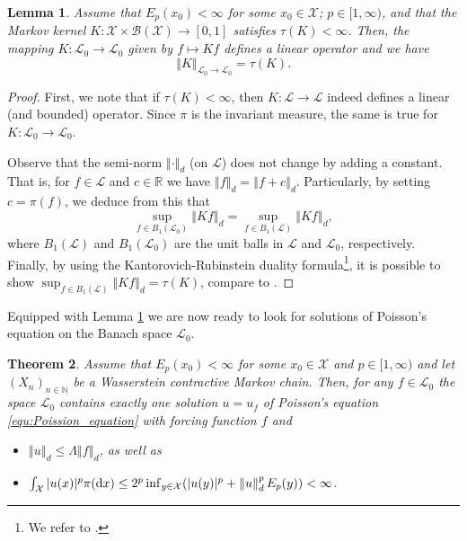 \documentclass[12pt]{article}
\theoremstyle{plain}
\newtheorem{thm}{Theorem}[section]
\newtheorem{lem}[thm]{Lemma}
\renewcommand{\d}{{\rm d}}
\newcommand{\norm}[1]{\left\Vert #1 \right\Vert}
\newcommand{\N}{\mathbb{N}}
\newcommand{\R}{\mathbb{R}}
\newcommand{\cX}{\mathcal{X}}
\begin{document}
{\begin{lem}\label{lem:operator_norm_Lipschitz}
Assume that $E_p(x_0) < \infty$ for some $x_0 \in \cX$; $p \in [1,\infty)$, and that the Markov kernel $K \colon \cX \times\mathcal{B}(\cX) \to [0,1]$ satisfies $\tau(K)< \infty$.
Then, the mapping $K \colon \mathscr{L}_0 \to \mathscr{L}_0$ given by $f \mapsto Kf$ defines a linear operator and we have 
\[
\norm{K}_{\mathscr{L}_0 \to \mathscr{L}_0} = \tau(K). 
\]  
\end{lem}

\begin{proof}
First, we note that if $\tau(K)<  \infty$, then $K \colon \mathscr{L} \to \mathscr{L}$ indeed defines a linear (and bounded) operator.
Since $\pi$ is the invariant measure, the same is true for $K \colon \mathscr{L}_0 \to \mathscr{L}_0$. 

	
Observe that the semi-norm $\norm{\cdot}_d$ (on $\mathscr{L}$) does not change by adding a constant. That is, for $f \in \mathscr{L}$ and $c \in \R$ we have $\norm{f}_d = \norm{f +c}_d$.
Particularly, by setting $c= \pi(f)$, we deduce from this that 
\[
\sup_{f \in B_1(\mathscr{L}_0)}\norm{K f}_d = \sup_{f \in B_1(\mathscr{L})}\norm{K f}_d,
\]
where $B_1(\mathscr{L})$ and $B_1(\mathscr{L}_0)$ are the unit balls in $\mathscr{L}$ and $\mathscr{L}_0$, respectively. 
Finally, by using the Kantorovich-Rubinstein duality formula\footnote{We refer to \cite[Chapter 5]{villani2009optimal}.}, it is possible to show $ \sup_{f \in B_1(\mathscr{L})}\norm{K f}_d = \tau(K)$, compare to \cite[Chapter 20.3]{douc2018markov}.
\end{proof}




Equipped with Lemma \ref{lem:operator_norm_Lipschitz} we are now ready to look for solutions of Poisson's equation on the Banach space $\mathscr{L}_0$. 




\begin{thm}\label{thm:Solution_Poission_Lipschitz_general}
Assume that $E_p(x_0) < \infty$ for some $x_0 \in \cX$ and $p \in [1,\infty)$ and let $(X_n)_{n \in \N}$ be a Wasserstein contractive Markov chain. 
Then, for any $f \in \mathscr{L}_0$ the space $\mathscr{L}_0$ contains exactly one solution $u = u_f$ of Poisson's equation \eqref{equ:Poission_equation} with forcing function $f$ and 
\begin{itemize}
	\item[i)] $\norm{u}_d \leq \Lambda \norm{f}_d$, as well as
	\item[ii)] $\int_\cX \vert u(x) \vert^p \pi(\d x) \leq 2^p \inf_{y \in \cX}(\vert u(y)\vert^p + \norm{u}_d^p E_p(y)) < \infty$.
\end{itemize}
\end{thm}   

}
\end{document}
